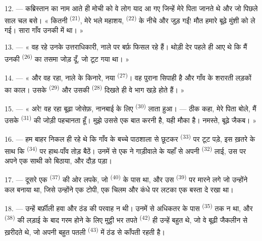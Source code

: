 12. --- कब्रिस्तान का नाम आते ही मोची को वे लोग याद आ गए जिन्हें मेरे पिता जानते
थे और जो पिछले साल चल बसे। « कितनी  \textsuperscript{(21)}, मेरे
भले महाशय,  \textsuperscript{(22)} के नीचे और जुड़ गईं! मौत हमारे
बूढ़े मुंशी को ले गई। सारा गाँव उनकी  में था। »

13. --- « वह रहे उनके उत्तराधिकारी, नाले पर बर्फ़ फिसल रहे हैं। थोड़ी देर पहले
ही आए थे कि मैं उनकी  \textsuperscript{(26)} का तसमा जोड़ दूँ,
जो टूट गया था। »

14. --- « और वह रहा, नाले के किनारे, नया 
\textsuperscript{(27)}। वह पुराना सिपाही है और गाँव के शरारती लड़कों का काल। उसके
 \textsuperscript{(29)} और उसकी 
\textsuperscript{(28)} दिखते ही वे भाग खड़े होते हैं। »

15. --- « अरे! वह रहा बूढ़ा जोसेफ़, नानबाई के लिए  \textsuperscript{(30)} लाता हुआ। --- ठीक कहा, मेरे पिता बोले, मैं उसके
 \textsuperscript{(31)} की जोड़ी पहचानता हूँ। मुझे उससे एक बात
करनी है, यही मौका है। नमस्ते, बूढ़े जैकब। »

16. --- हम बाहर निकल ही रहे थे कि गाँव के बच्चे पाठशाला से छूटकर
 \textsuperscript{(33)} पर टूट पड़े, इस ख़तरे के साथ
कि  \textsuperscript{(34)} पर हाथ-पाँव तोड़ बैठें। उनमें से एक ने
गाड़ीवाले के यहाँ से अपनी  \textsuperscript{(32)} लाई, उस पर अपने
एक साथी को बिठाया, और दौड़ पड़ा।

17. --- दूसरे एक  \textsuperscript{(37)} की ओर लपके, जो
 \textsuperscript{(40)} के पास था, और उस  \textsuperscript{(39)}
पर मारने लगे जो उन्होंने कल बनाया था, जिसे उन्होंने एक टोपी, एक चिलम और कंधे पर
लटका एक बस्ता दे रखा था।

18. --- उन्हें बर्फ़ीली हवा और ठंड की परवाह न थी। उनमें से अधिकतर के पास
 \textsuperscript{(35)} तक न था, और 
\textsuperscript{(38)} की लड़ाई के बाद गरम होने के लिए मुट्ठी भर तपते
 \textsuperscript{(42)} ही उन्हें बहुत थे, जो वे बूढ़ी जैकलीन
 से ख़रीदते थे, जो अपनी बहुत पतली 
\textsuperscript{(43)} में ठंड से काँपती रहती है।

\VUsaut{3.0mm}
\VUsaut{3.0mm}

